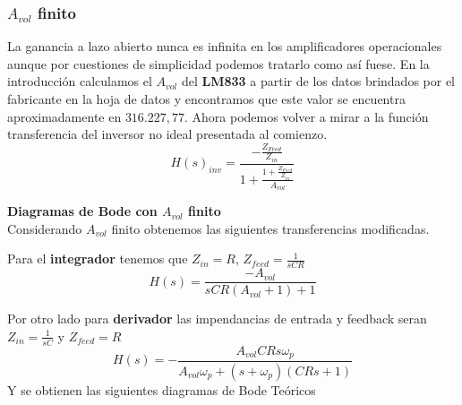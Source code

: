 \subsubsection{$A_{vol}$ finito}
La ganancia a lazo abierto nunca es infinita en los amplificadores operacionales aunque por cuestiones de simplicidad podemos tratarlo como así fuese. En la introducción calculamos el $A_{vol}$ del \textbf{LM833} a partir de los datos brindados por el fabricante en la hoja de datos y encontramos que este valor se encuentra aproximadamente en $316.227,77$.
Ahora podemos volver a mirar a la función transferencia del inversor no ideal presentada al comienzo.
$$H(s)_{inv} = \frac{-\frac{Z_{Feed}}{Z_{in}}}
{1+\frac{1+\frac{Z_{Feed}}{Z_{in}}}{A_{vol}}} $$


\textbf{Diagramas de Bode con $A_{vol}$ finito}\\
Considerando $A_{vol}$ finito obtenemos las siguientes transferencias modificadas.

Para el \textbf{integrador} tenemos que $Z_{in}=R$, $Z_{feed}=\frac{1}{sCR}$
$$H(s)=\frac{-A_{vol}}{sCR(A_{vol}+1)+1}$$

Por otro lado para \textbf{derivador} las impendancias de entrada y feedback seran $Z_{in} = \frac{1}{sC}$ y $Z_{feed}  = R$
$$H(s) = - \frac{A_{vol} C R s \omega_p}{A_{vol} \omega_p + \left(s + \omega_p\right) \left(C R s + 1\right)}$$
Y se obtienen las siguientes diagramas de Bode Teóricos 

